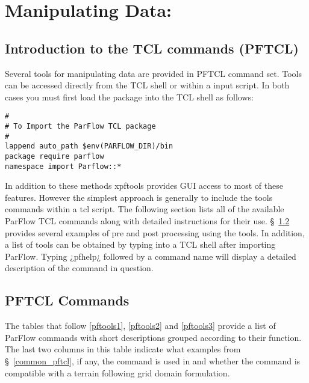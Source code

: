 
\chapter{Manipulating Data: \pftools{}}
\label{Manipulating Data}

\section{Introduction to the \parflow{} TCL commands (PFTCL) }
Several tools for manipulating data are provided in PFTCL command set.
Tools can be accessed directly from the TCL shell or within a \parflow{} input script.
In both cases you must first load the \parflow{} package into the TCL shell as follows:


\begin{display}\begin{verbatim}
#
# To Import the ParFlow TCL package
#
lappend auto_path $env(PARFLOW_DIR)/bin
package require parflow
namespace import Parflow::*
\end{verbatim}\end{display}

In addition to these methods xpftools provides GUI access to most of these features.  However
the simplest approach is generally to include the tools commands within a tcl script. The
following section lists all of the available ParFlow TCL commands along with detailed instructions for their use.
\S~\ref{PFTCL Commands} provides several examples of pre and post processing using the tools.  In addition, a list of
tools can be obtained by typing  into a TCL shell after importing ParFlow. Typing ¿pfhelp¿ followed by a
command name will display a detailed description of the command in question.


\section{PFTCL Commands}
\label{PFTCL Commands}
The tables that follow \ref{pftools1}, \ref{pftools2} and \ref{pftools3} provide a list of ParFlow commands with short descriptions grouped according to their function.
The last two columns in this table indicate what examples from \S~\ref{common_pftcl}, if any, the command is used in
and whether the command is compatible with a terrain following grid domain formulation.
\newpage

